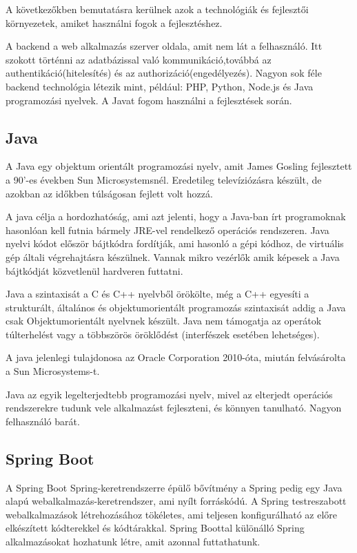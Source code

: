 
A következőkben bemutatásra kerülnek azok a technológiák és fejlesztői környezetek, amiket használni fogok a fejlesztéshez.


A backend a web alkalmazás szerver oldala, amit nem lát a felhasználó. Itt szokott történni az adatbázissal való kommunikáció,továbbá az authentikáció(hitelesítés) és az authorizáció(engedélyezés). Nagyon sok féle backend technológia létezik mint, például: PHP, Python, Node.js és Java programozási nyelvek. A Javat fogom használni a fejlesztések során.

\subsection{Java}

A Java egy objektum orientált programozási nyelv, amit James Gosling fejlesztett a 90’-es években Sun Microsystemsnél. Eredetileg televíziózásra készült, de azokban az időkben túlságosan fejlett volt hozzá.

A java célja a hordozhatóság, ami azt jelenti, hogy a Java-ban írt programoknak hasonlóan kell futnia bármely JRE-vel rendelkező operációs rendszeren. Java nyelvi kódot először bájtkódra fordítják, ami hasonló a gépi kódhoz, de virtuális gép általi végrehajtásra készülnek. Vannak mikro vezérlők amik képesek a Java bájtkódját közvetlenül hardveren futtatni.

Java a szintaxisát a C és C++ nyelvből örökölte, még a C++ egyesíti a strukturált, általános és objektumorientált programozás szintaxisát addig a Java csak Objektumorientált nyelvnek készült. Java nem támogatja az operátok túlterhelést vagy a többszörös öröklődést (interfészek esetében lehetséges).

A java jelenlegi tulajdonosa az Oracle Corporation 2010-óta, miután felvásárolta a Sun Microsystems-t.

Java az egyik legelterjedtebb programozási nyelv, mivel az elterjedt operációs rendszerekre tudunk vele alkalmazást fejleszteni, és könnyen tanulható. Nagyon felhasználó barát\cite{Java}.

\subsection{Spring Boot}

A Spring Boot Spring-keretrendszerre épülő bővítmény a Spring pedig egy Java alapú webalkalmazás-keretrendszer, ami nyílt forráskódú. A Spring testreszabott webalkalmazások létrehozásához tökéletes, ami teljesen konfigurálható az előre elkészített kódterekkel és kódtárakkal. Spring Boottal különálló Spring alkalmazásokat hozhatunk létre, amit azonnal futtathatunk.

